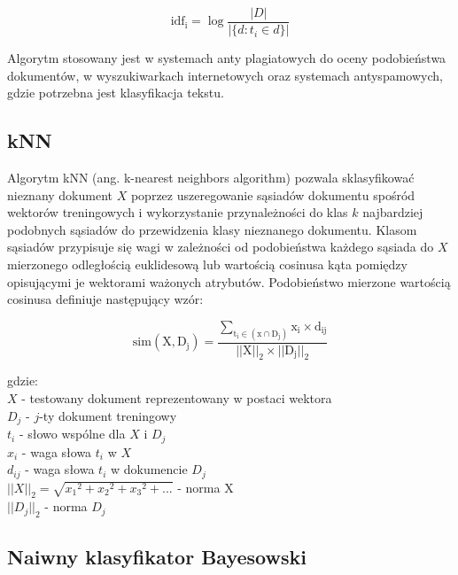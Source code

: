 \documentclass[a4paper, 10pt]{article}
\begin{document}
\begin{equation}
\mathrm{idf_{i}} =  \log \frac{|D|}{|\{d: t_{i} \in d\}|}
\end{equation}

Algorytm stosowany jest w systemach anty plagiatowych do oceny podobieństwa dokumentów, w wyszukiwarkach internetowych oraz systemach
antyspamowych, gdzie potrzebna jest klasyfikacja tekstu.

\subsection{kNN}

Algorytm kNN (ang. k-nearest neighbors algorithm) pozwala sklasyfikować nieznany dokument $X$  poprzez uszeregowanie sąsiadów dokumentu spośród wektorów treningowych i wykorzystanie przynależności do klas $k$ najbardziej podobnych sąsiadów do przewidzenia klasy nieznanego dokumentu. Klasom sąsiadów przypisuje się wagi w zależności od podobieństwa każdego sąsiada do $X$ mierzonego odległością euklidesową lub wartością cosinusa kąta pomiędzy opisującymi je wektorami ważonych atrybutów. Podobieństwo mierzone wartością cosinusa definiuje następujący wzór:

\begin{equation}
\mathrm{sim(X, D_{j}) = \frac{
\sum_{ t_{i} \in (x\cap D_{j})
  }x_{i} \times d_{ij}}{||X||_{2} \times ||D_{j}||_{2}}}
\end{equation}

gdzie:\\
$X$ - testowany dokument reprezentowany w postaci wektora\\
$D_{j}$ - $j$-ty dokument treningowy\\
$t_{i}$ - słowo wspólne dla $X$ i $D_{j}$\\
$x_{i}$ - waga słowa $t_{i}$ w $X$\\
$d_{ij}$ - waga słowa $t_{i}$ w dokumencie $D_{j}$\\
$||X||_{2} = \sqrt{{x_{1}}^{2} + {x_{2}}^{2} + {x_{3}}^{2} + ...}$ - norma X\\
$||D_{j}||_{2}$ - norma $D_{j}$\\




\subsection{Naiwny klasyfikator Bayesowski}
\end{document}
